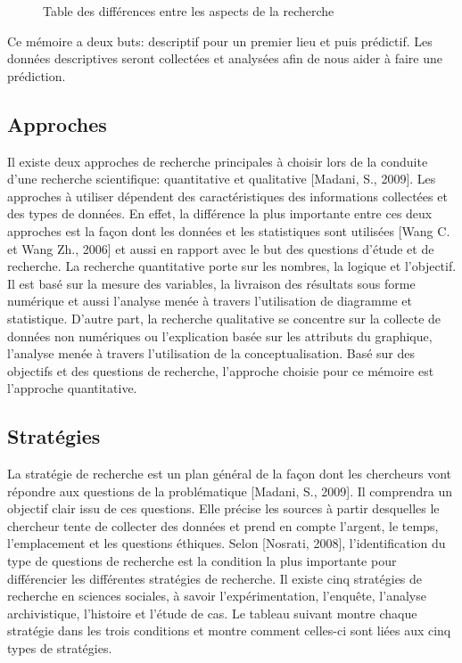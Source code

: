 \documentclass[12pt]{article}
\begin{document}
{\begin{center}
\begin{tabular}{|p{3cm}|p{6cm}|p{6cm}|}
\end{tabular}
\end{center}
\begin{figure}[H]
	\centering
    
     \caption{ Table des différences entre les aspects de la recherche }
    \label{fig:19}
\end{figure}

Ce mémoire a deux buts: descriptif pour un premier lieu et puis prédictif. Les données descriptives seront collectées et analysées afin de nous aider à faire une prédiction.

\subsection{Approches}

Il existe deux approches de recherche principales à choisir lors de la conduite d'une recherche scientifique: quantitative et qualitative {\color{red}[Madani, S., 2009]}. Les approches à utiliser dépendent des caractéristiques des informations collectées et des types de données. En effet, la différence la plus importante entre ces deux approches est la façon dont les données et les statistiques sont utilisées {\color{red}[Wang C. et Wang Zh., 2006]} et aussi en rapport avec le but des questions d'étude et de recherche. La recherche quantitative porte sur les nombres, la logique et l'objectif. Il est basé sur la mesure des variables, la livraison des résultats sous forme numérique et aussi l'analyse menée à travers l'utilisation de diagramme et statistique.
D'autre part, la recherche qualitative se concentre sur la collecte de données non numériques ou l'explication basée sur les attributs du graphique, l'analyse menée à travers l'utilisation de la conceptualisation.
Basé sur des objectifs et des questions de recherche, l'approche choisie pour ce mémoire est l'approche quantitative.
\subsection{Stratégies}
La stratégie de recherche est un plan général de la façon dont les chercheurs vont répondre aux questions de la problématique {\color{red}[Madani, S., 2009]}. Il comprendra un objectif clair issu de ces questions. Elle précise les sources à partir desquelles le chercheur tente de collecter des données et prend en compte l'argent, le temps, l'emplacement et les questions éthiques. Selon {\color{red}[Nosrati, 2008]}, l'identification du type de questions de recherche est la condition la plus importante pour différencier les différentes stratégies de recherche.
Il existe cinq stratégies de recherche en sciences sociales, à savoir l'expérimentation, l'enquête, l'analyse archivistique, l'histoire et l'étude de cas. Le tableau suivant montre chaque stratégie dans les trois conditions et montre comment celles-ci sont liées aux cinq types de stratégies.

}
\end{document}

